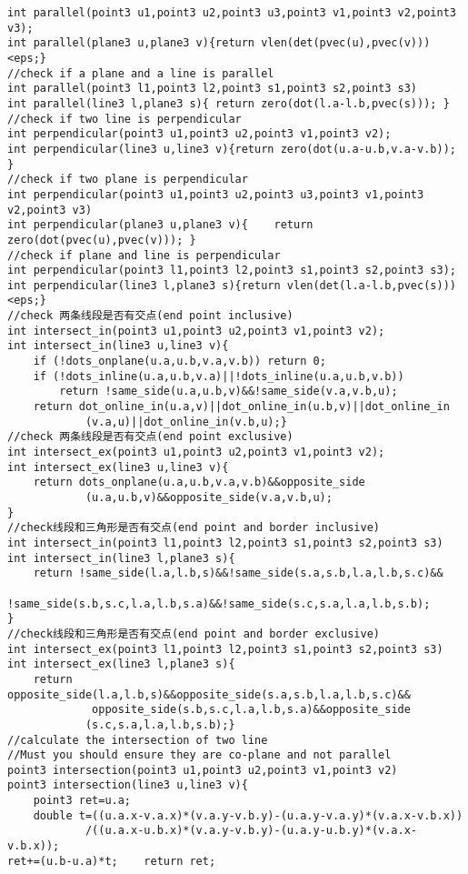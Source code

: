 \documentclass{article}
\begin{document}
\begin{lstlisting}
int parallel(point3 u1,point3 u2,point3 u3,point3 v1,point3 v2,point3 v3);
int parallel(plane3 u,plane3 v){return vlen(det(pvec(u),pvec(v)))<eps;}
//check if a plane and a line is parallel
int parallel(point3 l1,point3 l2,point3 s1,point3 s2,point3 s3)
int parallel(line3 l,plane3 s){ return zero(dot(l.a-l.b,pvec(s))); }
//check if two line is perpendicular
int perpendicular(point3 u1,point3 u2,point3 v1,point3 v2);
int perpendicular(line3 u,line3 v){return zero(dot(u.a-u.b,v.a-v.b)); }
//check if two plane is perpendicular
int perpendicular(point3 u1,point3 u2,point3 u3,point3 v1,point3 v2,point3 v3)
int perpendicular(plane3 u,plane3 v){    return zero(dot(pvec(u),pvec(v))); }
//check if plane and line is perpendicular
int perpendicular(point3 l1,point3 l2,point3 s1,point3 s2,point3 s3);
int perpendicular(line3 l,plane3 s){return vlen(det(l.a-l.b,pvec(s)))<eps;}
//check 两条线段是否有交点(end point inclusive)
int intersect_in(point3 u1,point3 u2,point3 v1,point3 v2);
int intersect_in(line3 u,line3 v){
    if (!dots_onplane(u.a,u.b,v.a,v.b)) return 0;
    if (!dots_inline(u.a,u.b,v.a)||!dots_inline(u.a,u.b,v.b))
        return !same_side(u.a,u.b,v)&&!same_side(v.a,v.b,u);
    return dot_online_in(u.a,v)||dot_online_in(u.b,v)||dot_online_in
            (v.a,u)||dot_online_in(v.b,u);}
//check 两条线段是否有交点(end point exclusive)
int intersect_ex(point3 u1,point3 u2,point3 v1,point3 v2);
int intersect_ex(line3 u,line3 v){
    return dots_onplane(u.a,u.b,v.a,v.b)&&opposite_side
            (u.a,u.b,v)&&opposite_side(v.a,v.b,u);
}
//check线段和三角形是否有交点(end point and border inclusive)
int intersect_in(point3 l1,point3 l2,point3 s1,point3 s2,point3 s3)
int intersect_in(line3 l,plane3 s){
    return !same_side(l.a,l.b,s)&&!same_side(s.a,s.b,l.a,l.b,s.c)&&
        !same_side(s.b,s.c,l.a,l.b,s.a)&&!same_side(s.c,s.a,l.a,l.b,s.b);
}
//check线段和三角形是否有交点(end point and border exclusive)
int intersect_ex(point3 l1,point3 l2,point3 s1,point3 s2,point3 s3)
int intersect_ex(line3 l,plane3 s){
    return opposite_side(l.a,l.b,s)&&opposite_side(s.a,s.b,l.a,l.b,s.c)&&   
             opposite_side(s.b,s.c,l.a,l.b,s.a)&&opposite_side
            (s.c,s.a,l.a,l.b,s.b);}
//calculate the intersection of two line
//Must you should ensure they are co-plane and not parallel
point3 intersection(point3 u1,point3 u2,point3 v1,point3 v2)
point3 intersection(line3 u,line3 v){
    point3 ret=u.a;
    double t=((u.a.x-v.a.x)*(v.a.y-v.b.y)-(u.a.y-v.a.y)*(v.a.x-v.b.x))
            /((u.a.x-u.b.x)*(v.a.y-v.b.y)-(u.a.y-u.b.y)*(v.a.x-v.b.x));
ret+=(u.b-u.a)*t;    return ret;

\end{lstlisting}
\end{document}
